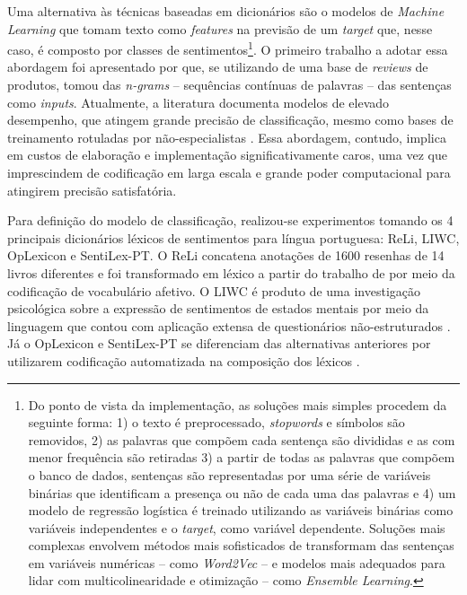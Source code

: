 \documentclass[
12pt,				%
openright,			%
twoside,			%
a4paper,			%
english,			%
french,				%
spanish,			%
brazil				%
]{abntex2}
\begin{document}
Uma alternativa às técnicas baseadas em dicionários são o modelos de \emph{Machine Learning} que tomam texto como \emph{features} na previsão de um \emph{target} que, nesse caso, é composto por classes de sentimentos\footnote{Do ponto de vista da implementação, as soluções mais simples procedem da seguinte forma: 1) o texto é preprocessado, \emph{stopwords} e símbolos são removidos, 2) as palavras que compõem cada sentença são divididas e as com menor frequência são retiradas 3) a partir de todas as palavras que compõem o banco de dados, sentenças são representadas por uma série de variáveis binárias que identificam a presença ou não de cada uma das palavras e 4) um modelo de regressão logística é treinado utilizando as variáveis binárias como variáveis independentes e o \emph{target}, como variável dependente. Soluções mais complexas envolvem métodos mais sofisticados de transformam das sentenças em variáveis numéricas -- como \emph{Word2Vec} -- e modelos mais adequados para lidar com multicolinearidade e otimização -- como \emph{Ensemble Learning}.}. O primeiro trabalho a adotar essa abordagem foi apresentado por  que, se utilizando de uma base de \emph{reviews} de produtos, tomou das \emph{n-grams} -- sequências contínuas de palavras -- das sentenças como \emph{inputs}. Atualmente, a literatura documenta modelos de elevado desempenho, que atingem grande precisão de classificação, mesmo como bases de treinamento rotuladas por não-especialistas \cite{howard2018universal, sun2019fine, yang2019xlnet}. Essa abordagem, contudo, implica em custos de elaboração e implementação significativamente caros, uma vez que imprescindem de codificação em larga escala e grande poder computacional para atingirem precisão satisfatória.

Para definição do modelo de classificação, realizou-se experimentos tomando os 4 principais dicionários léxicos de sentimentos para língua portuguesa: ReLi, LIWC, OpLexicon e SentiLex-PT. O ReLi concatena anotações de 1600 resenhas de 14 livros diferentes \cite{freitas2012vampiro, freitas2014sparkling} e foi transformado em léxico a partir do trabalho de  por meio da codificação de vocabulário afetivo. O LIWC é produto de uma investigação psicológica sobre a expressão de sentimentos de estados mentais por meio da linguagem que contou com aplicação extensa de questionários não-estruturados \cite{pennebaker1996cognitive, pennebaker1997linguistic}. Já o OpLexicon e SentiLex-PT se diferenciam das alternativas anteriores por utilizarem codificação automatizada na composição dos léxicos \cite{souza2011construction, carvalho2015sentilex}.
\end{document}
